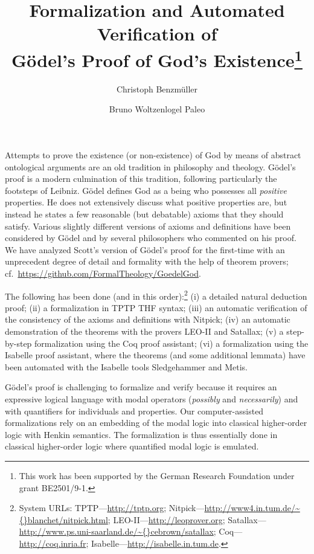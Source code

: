 \documentclass{llncs}
\title{ Formalization and Automated Verification of %
    \\ G\"{o}del's Proof of God's Existence\thanks{This work has been
    supported by the German Research Foundation under grant
    BE2501/9-1.}  }
\author{
  Christoph Benzm\"{u}ller\inst{1} 
  \and 
  Bruno Woltzenlogel Paleo\inst{2}
}
\institute{
  Dahlem Center for Intelligent Systems, Freie Universit\"{a}t Berlin, Germany\\
  \and 
  Theory and Logic Group, Vienna University of Technology, Austria \\
}
\begin{document}
\maketitle

Attempts to prove the existence (or non-existence) of God by means of
abstract ontological arguments are an old tradition in philosophy and
theology.  G\"{o}del's proof \cite{Goedel1970,GoedelNotes} is a modern culmination of
this tradition, following particularly the footsteps of Leibniz.
%
G\"{o}del defines God as a being who possesses all \emph{positive} properties.
He does not extensively discuss what positive properties are, 
but instead he states a few reasonable (but debatable) axioms that they should satisfy.
Various slightly different versions of axioms and definitions have
been considered by G\"{o}del and by several philosophers who commented
on his proof. %
We have analyzed Scott's version of G\"{o}del's proof \cite{ScottNotes} for the first-time
with an unprecedent degree of detail 
and formality with the help of theorem provers; cf.~\url{https://github.com/FormalTheology/GoedelGod}.

The following has been done (and in this order):\footnote{System URLs:
 TPTP---\url{http://tptp.org};
 Nitpick---\url{http://www4.in.tum.de/\~{}blanchet/nitpick.html};
 LEO-II---\url{http://leoprover.org};
 Satallax---\url{http://www.ps.uni-saarland.de/\~{}cebrown/satallax}; 
 Coq---\url{http://coq.inria.fr};
 Isabelle---\url{http://isabelle.in.tum.de}.
}
(i) a detailed natural deduction proof;
%
(ii) a formalization in TPTP THF syntax;
%
(iii) an automatic verification of the consistency of the axioms and 
definitions with Nitpick;
%
(iv) an automatic demonstration of the theorems with the provers LEO-II and Satallax;
%
(v) a step-by-step formalization using the Coq proof assistant;
%
(vi) a formalization using the Isabelle proof assistant, where the
theorems (and some additional lemmata) have been automated with the
Isabelle tools Sledgehammer and Metis.


G\"{o}del's proof is challenging to formalize and verify because it
requires an expressive logical language with modal operators
(\emph{possibly} and \emph{necessarily}) and with
quantifiers for individuals and properties.  Our computer-assisted formalizations rely on an
embedding of the modal logic into classical higher-order logic with
Henkin semantics. The formalization is thus essentially
done in classical higher-order logic where  quantified modal logic is
emulated.
\end{document}
